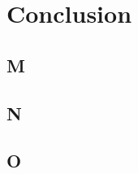 \chapter{Conclusion}\label{ch:conclusion}

\section{M}\label{sec:M}
\lipsum[1-5]

\section{N}\label{sec:N}
\lipsum[1-5]

\section{O}\label{sec:O}
\lipsum[1-5]